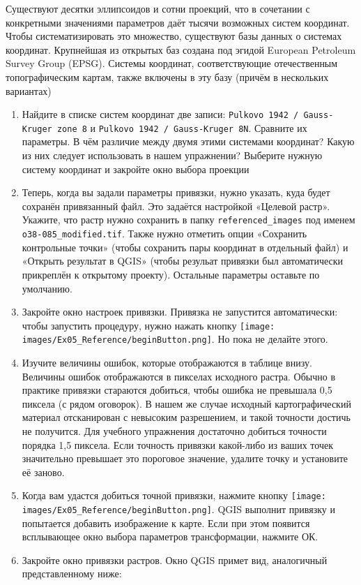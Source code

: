 \documentclass[
  12pt,
]{book}
\begin{document}
Существуют десятки эллипсоидов и сотни проекций, что в сочетании с конкретными значениями параметров даёт тысячи возможных систем координат. Чтобы систематизировать это множество, существуют базы данных о системах координат. Крупнейшая из открытых баз создана под эгидой European Petroleum Survey Group (EPSG). Системы координат, соответствующие отечественным топографическим картам, также включены в эту базу (причём в нескольких вариантах)

\begin{enumerate}
\def\labelenumi{\arabic{enumi}.}
\setcounter{enumi}{14}
\item
  Найдите в списке систем координат две записи: \texttt{Pulkovo\ 1942\ /\ Gauss-Kruger\ zone\ 8} и \texttt{Pulkovo\ 1942\ /\ Gauss-Kruger\ 8N}. Сравните их параметры. В чём различие между двумя этими системами координат? Какую из них следует использовать в нашем упражнении? Выберите нужную систему координат и закройте окно выбора проекции
\item
  Теперь, когда вы задали параметры привязки, нужно указать, куда будет сохранён привязанный файл. Это задаётся настройкой «Целевой растр». Укажите, что растр нужно сохранить в папку \texttt{referenced\_images} под именем \texttt{o38-085\_modified.tif}. Также нужно отметить опции «Сохранить контрольные точки» (чтобы сохранить пары координат в отдельный файл) и «Открыть результат в QGIS» (чтобы резульат привязки был автоматически прикреплён к открытому проекту). Остальные параметры оставьте по умолчанию.
\item
  Закройте окно настроек привязки. Привязка не запустится автоматически: чтобы запустить процедуру, нужно нажать кнопку \texttt{[image: images/Ex05\_Reference/beginButton.png]}. Но пока не делайте этого.
\item
  Изучите величины ошибок, которые отображаются в таблице внизу. Величины ошибок отображаются в пикселах исходного растра. Обычно в практике привязки стараются добиться, чтобы ошибка не превышала 0,5 пиксела (с рядом оговорок). В нашем же случае исходный картографический материал отсканирован с невысоким разрешением, и такой точности достичь не получится. Для учебного упражнения достаточно добиться точности порядка 1,5 пиксела. Если точность привязки какой-либо из ваших точек значительно превышает это пороговое значение, удалите точку и установите её заново.
\item
  Когда вам удастся добиться точной привязки, нажмите кнопку \texttt{[image: images/Ex05\_Reference/beginButton.png]}. QGIS выполнит привязку и попытается добавить изображение к карте. Если при этом появится всплывающее окно выбора параметров трансформации, нажмите ОК.
\item
  Закройте окно привязки растров. Окно QGIS примет вид, аналогичный представленному ниже:


\end{enumerate}
\end{document}
